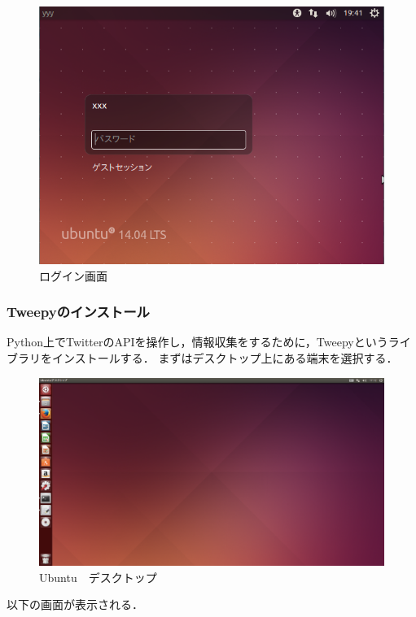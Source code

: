 \begin{figure}[H]
\centering
\includegraphics[width=15cm]{ubuntuinstall07.png}
\caption{ログイン画面}\label{イメージ画面}
\end{figure}

\subsubsection{Tweepyのインストール}

Python上でTwitterのAPIを操作し，情報収集をするために，Tweepyというライブラリをインストールする．
まずはデスクトップ上にある端末を選択する．
\begin{figure}[H]
\centering
\includegraphics[width=15cm]{tweepyinstall001.png}
\caption{Ubuntu　デスクトップ}\label{Ubuntu　デスクトップ画像}
\end{figure}

以下の画面が表示される．

